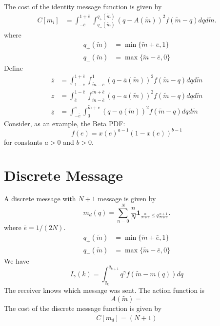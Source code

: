 \documentclass{article}
\begin{document}
The cost of the identity message function is given by
\begin{align}
	C[m_{i}]&=\int_{-\bar{e}}^{1+\bar{e}}{\int_{q_{-}(\widetilde{m})}^{q_{+}(\widetilde{m})}{(q-A(\widetilde{m}))^{2}f(\widetilde{m}-q)dq}d\widetilde{m}}.
\end{align}
where
\begin{align}
	q_{+}(\widetilde{m})&=\min\{\widetilde{m}+\bar{e},1\}\\
	q_{-}(\widetilde{m})&=\max\{\widetilde{m}-\bar{e},0\}
\end{align}
Define
\begin{align}
	\overline{z}&=\int_{1-\bar{e}}^{1+\bar{e}}{\int_{\widetilde{m}-\bar{e}}^{1}{(q-\overline{a}(\widetilde{m}))^{2}f(\widetilde{m}-q)dq}d\widetilde{m}}\\
	z&=\int_{\bar{e}}^{1-\bar{e}}{\int_{\widetilde{m}-\bar{e}}^{\widetilde{m}+\bar{e}}{(q-a(\widetilde{m}))^{2}f(\widetilde{m}-q)dq}d\widetilde{m}}\\
	\underline{z}&=\int_{-\bar{e}}^{\bar{e}}{\int_{0}^{\widetilde{m}+\bar{e}}{(q-\underline{a}(\widetilde{m}))^{2}f(\widetilde{m}-q)dq}d\widetilde{m}}
\end{align}
Consider, as an example, the Beta PDF:
\begin{equation}
	f(e)=x(e)^{a-1}(1-x(e))^{b-1}
\end{equation}
for constants $a>0$ and $b>0$. 

\section{Discrete Message}
A discrete message with $N+1$ message is given by
\begin{equation}
	m_{d}(q)=\sum_{n=0}^{N}\frac{n}{N}\mathbf{1}_{\frac{n}{N+1}\leq q\frac{n+1}{N+1}}.
\end{equation}
where $\bar{e}=1/(2N)$. 
\begin{align}
	q_{+}(\widetilde{m})&=\min\{\widetilde{m}+\bar{e},1\}\\
	q_{-}(\widetilde{m})&=\max\{\widetilde{m}-\bar{e},0\}
\end{align}
We have
\begin{equation}
	I_{\gamma}(k)=\int_{q_{k}}^{q_{k+1}}{q^\gamma f(\widetilde{m}-m(q))dq}
\end{equation}
The receiver knows which message was sent. The action function is
\begin{equation}
	A(\widetilde{m})=
\end{equation}
The cost of the discrete message function is given by
\begin{align}
	C[m_{d}]=(N+1)
\end{align}
\end{document}

